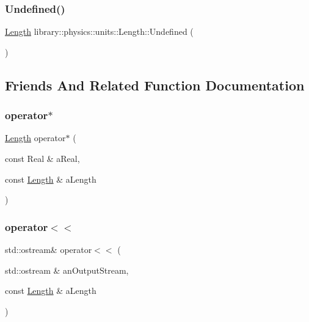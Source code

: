 \subsubsection{\texorpdfstring{Undefined()}{Undefined()}}
{\footnotesize\ttfamily \hyperlink{classlibrary_1_1physics_1_1units_1_1_length}{Length} library\+::physics\+::units\+::\+Length\+::\+Undefined (\begin{DoxyParamCaption}{ }\end{DoxyParamCaption})\hspace{0.3cm}{\ttfamily [static]}}



\subsection{Friends And Related Function Documentation}
\mbox{\label{classlibrary_1_1physics_1_1units_1_1_length_a72059ec2f1e930a0e75a3a808e434363}} 
\subsubsection{\texorpdfstring{operator$\ast$}{operator*}}
{\footnotesize\ttfamily \hyperlink{classlibrary_1_1physics_1_1units_1_1_length}{Length} operator$\ast$ (\begin{DoxyParamCaption}\item[{const Real \&}]{a\+Real,  }\item[{const \hyperlink{classlibrary_1_1physics_1_1units_1_1_length}{Length} \&}]{a\+Length }\end{DoxyParamCaption})\hspace{0.3cm}{\ttfamily [friend]}}

\mbox{\label{classlibrary_1_1physics_1_1units_1_1_length_a95a13170a8d57cb0060eae94520eace4}} 
\subsubsection{\texorpdfstring{operator$<$$<$}{operator<<}}
{\footnotesize\ttfamily std\+::ostream\& operator$<$$<$ (\begin{DoxyParamCaption}\item[{std\+::ostream \&}]{an\+Output\+Stream,  }\item[{const \hyperlink{classlibrary_1_1physics_1_1units_1_1_length}{Length} \&}]{a\+Length }\end{DoxyParamCaption})\hspace{0.3cm}{\ttfamily [friend]}}



